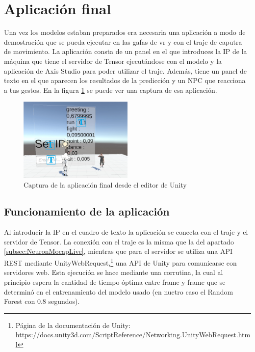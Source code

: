 \section{Aplicación final}
\label{sec:aplicacionFinal}
Una vez los modelos estaban preparados era necesaria una aplicación a modo de demostración que se pueda ejecutar en las gafas de \gls{vr} y con el traje de caputra de movimiento.
La aplicación consta de un panel en el que introduces la IP de la máquina que tiene el servidor de Tensor ejecutándose con el modelo y la aplicación de Axis Studio para poder utilizar el traje.
Además, tiene un panel de texto en el que aparecen los resultados de la predicción y un NPC que reacciona a tus gestos. En la figura \ref{fig:DemoCaptura} se puede ver una captura de esa aplicación.

\begin{figure}[H]
    \centering
    \includegraphics[width=0.5\textwidth]{Imagenes/Bitmap/Demo.PNG}
    \caption{Captura de la aplicación final desde el editor de Unity}
    \label{fig:DemoCaptura}
\end{figure}

\subsection{Funcionamiento de la aplicación}
Al introducir la IP en el cuadro de texto la aplicación se conecta con el traje y el servidor de Tensor.
La conexión con el traje es la misma que la del apartado \ref{subsec:NeuronMocapLive}, mientras que para el servidor se utiliza una \gls{API REST} mediante UnityWebRequest,\footnote{Página de la documentación de Unity: \url{https://docs.unity3d.com/ScriptReference/Networking.UnityWebRequest.html}} una API de Unity para comunicarse con servidores web.
Esta ejecución se hace mediante una corrutina, la cual al principio espera la cantidad de tiempo óptima entre frame y frame que se determinó en el entrenamiento del modelo usado (en nuetro caso el Random Forest con 0.8 segundos).

